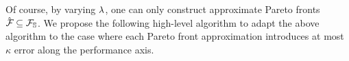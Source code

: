 Of course, by varying $\lambda$, one can only construct approximate
Pareto fronts $\hat{\mathcal{F}_{}} \subseteq \mathcal{F}_{\mathbb{S}}$.
We propose the following high-level algorithm to adapt the above
algorithm to the case where each Pareto front approximation introduces at
most $\kappa$ error along the performance axis.
